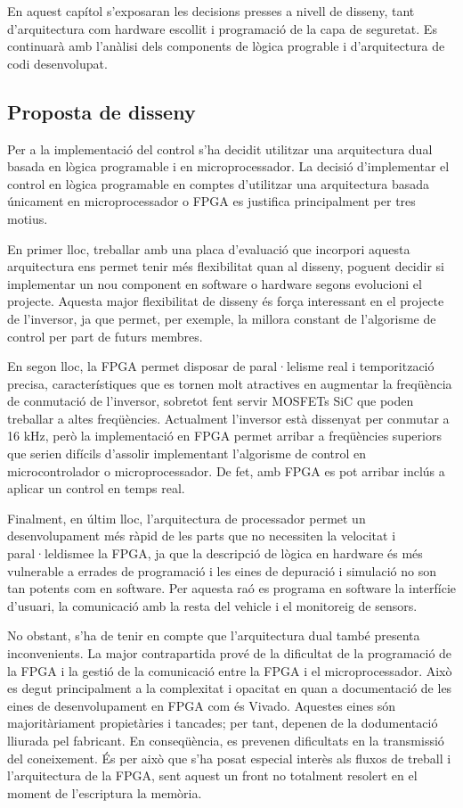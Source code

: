 En aquest capítol s'exposaran les decisions presses a nivell de disseny, tant
d'arquitectura com hardware escollit i programació de la capa de seguretat. Es
continuarà amb l'anàlisi dels components de lògica prograble i d'arquitectura
de codi desenvolupat.

\subsection{ Proposta de disseny }
{
    Per a la implementació del control s'ha decidit utilitzar una arquitectura
    dual basada en lògica programable i en microprocessador. La decisió
    d'implementar el control en lògica programable en comptes d'utilitzar una
    arquitectura basada únicament en microprocessador o FPGA es justifica
    principalment per tres motius.

    En primer lloc, treballar amb una placa d'evaluació que incorpori aquesta
    arquitectura ens permet tenir més flexibilitat quan al disseny, poguent
    decidir si implementar un nou component en software o hardware segons
    evolucioni el projecte. Aquesta major flexibilitat de disseny és força
    interessant en el projecte de l'inversor, ja que permet, per exemple, la
    millora constant de l'algorisme de control per part de futurs membres.

    En segon lloc, la FPGA permet disposar de paral·lelisme real i
    temporització precisa, característiques que es tornen molt atractives en
    augmentar la freqüència de conmutació de l'inversor, sobretot fent servir
    MOSFETs SiC que poden treballar a altes freqüències. Actualment l'inversor
    està dissenyat per conmutar a 16 kHz, però la implementació en FPGA permet
    arribar a freqüències superiors que serien difícils d'assolir implementant
    l'algorisme de control en microcontrolador o microprocessador. De fet, amb
    FPGA es pot arribar inclús a aplicar un control en temps real.

    Finalment, en últim lloc, l'arquitectura de processador permet un
    desenvolupament més ràpid de les parts que no necessiten la velocitat i
    paral·leldismee la FPGA, ja que la descripció de lògica en hardware és més
    vulnerable a errades de programació i les eines de depuració i simulació no
    son tan potents com en software. Per aquesta raó es programa en software la
    interfície d'usuari, la comunicació amb la resta del vehicle i el
    monitoreig de sensors.

    No obstant, s'ha de tenir en compte que l'arquitectura dual també presenta
    inconvenients. La major contrapartida prové de la dificultat de la
    programació de la FPGA i la gestió de la comunicació entre la FPGA i el
    microprocessador. Això es degut principalment a la complexitat i opacitat
    en quan a documentació de les eines de desenvolupament en FPGA com és
    Vivado. Aquestes eines són majoritàriament propietàries i tancades; per
    tant, depenen de la dodumentació lliurada pel fabricant. En conseqüència,
    es prevenen dificultats en la transmissió del coneixement. És per això que
    s'ha posat especial interès als fluxos de treball i l'arquitectura de la
    FPGA, sent aquest un front no totalment resolert en el moment de
    l'escriptura la memòria.

}
